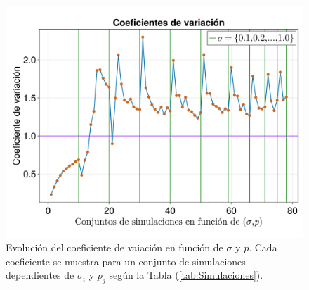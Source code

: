\begin{figure}[h!]
	\centering
	\includegraphics[scale=0.24]{../Imagenes/CoeficientesVariacion}
	\caption{Evolución del coeficiente de vaiación en función de $\sigma$ y $p$. Cada coeficiente se muestra para un conjunto de simulaciones dependientes de $\sigma_i$ y $p_j$ según la Tabla (\ref{tab:Simulaciones}).}
	\label{fig:CoeficientesVariacion}
\end{figure}

